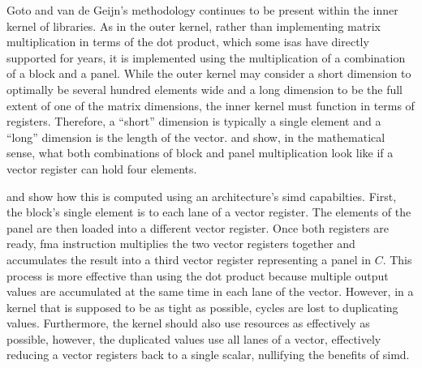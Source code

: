 \documentclass[\main/thesis.tex]{subfiles}
\begin{document}

Goto and van de Geijn's methodology continues to be present within the inner kernel of libraries.
As in the outer kernel, rather than implementing matrix multiplication in terms of the dot product, which some \glspl{isa} have directly supported for years\footnotemark, it is implemented using the multiplication of a combination of a block and a panel.
While the outer kernel may consider a short dimension to optimally be several hundred elements wide and a long dimension to be the full extent of one of the matrix dimensions, the inner kernel must function in terms of registers.
Therefore, a ``short'' dimension is typically a single element and a ``long'' dimension is the length of the vector.
 and  show, in the mathematical sense, what both combinations of block and panel multiplication look like if a vector register can hold four elements.

 and  show how this is computed using an architecture's \gls{simd} capabilties.
First, the block's single element is  to each \gls{lane} of a vector register.
The elements of the panel are then loaded into a different vector register.
Once both registers are ready,  \gls{fma} instruction multiplies the two vector registers together and accumulates the result into a third vector register representing a panel in $C$.
This process is more effective than using the dot product because multiple output values are accumulated at the same time in each \gls{lane} of the vector.
However, in a kernel that is supposed to be as tight as possible, cycles are lost to duplicating values.
Furthermore, the kernel should also use resources as effectively as possible, however, the duplicated values use all \glspl{lane} of a vector, effectively reducing a vector registers back to a single scalar, nullifying the benefits of \gls{simd}.
\end{document}
